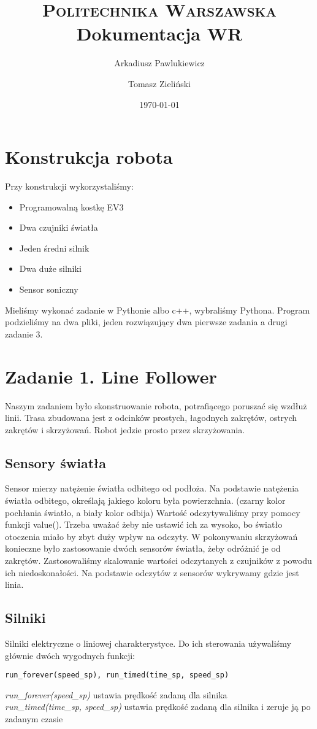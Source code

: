 \documentclass[paper=a4, fontsize=11pt]{scrartcl} %
\title{	
\normalfont \normalsize 
\textsc{Politechnika Warszawska} \\ [25pt] %
\huge Dokumentacja WR \\ %
}
\author{Arkadiusz Pawlukiewicz \and Tomasz Zieliński}
\date{\normalsize\today}
\numberwithin{equation}{section} %
\numberwithin{figure}{section} %
\numberwithin{table}{section} %
\begin{document}
\maketitle 

\section{Konstrukcja robota}
Przy konstrukcji wykorzystaliśmy:
\begin{itemize}  
\item Programowalną kostkę EV3 
\item Dwa czujniki światła  
\item Jeden średni silnik  
\item Dwa duże silniki  
\item Sensor soniczny 
\end{itemize}
Mieliśmy wykonać zadanie w Pythonie albo c++, wybraliśmy Pythona.  
Program podzieliśmy na dwa pliki, jeden rozwiązujący dwa pierwsze zadania a drugi zadanie 3. 
\section{Zadanie 1. Line Follower}
Naszym zadaniem było skonstruowanie robota, potrafiącego poruszać się wzdłuż linii. Trasa zbudowana jest z odcinków prostych, łagodnych zakrętów, ostrych zakrętów i skrzyżowań. Robot  jedzie prosto przez skrzyżowania. 
\subsection{Sensory światła }
Sensor mierzy natężenie światła odbitego od podłoża.  Na podstawie natężenia światła odbitego, określają jakiego koloru była powierzchnia. (czarny kolor pochłania światło, a biały kolor odbija) Wartość odczytywaliśmy przy pomocy funkcji value(). Trzeba uważać żeby nie ustawić ich za wysoko, bo światło otoczenia miało by zbyt duży wpływ na odczyty. W pokonywaniu  skrzyżowań konieczne było zastosowanie dwóch sensorów światła, żeby odróżnić je od zakrętów.  Zastosowaliśmy skalowanie wartości odczytanych z czujników z powodu ich  niedoskonałości.  Na podstawie odczytów z sensorów wykrywamy gdzie jest linia. 
\subsection{Silniki}
Silniki elektryczne o liniowej charakterystyce. Do ich sterowania używaliśmy głównie dwóch wygodnych funkcji:
\begin{lstlisting}
run_forever(speed_sp), run_timed(time_sp, speed_sp)
\end{lstlisting}
\textit{run\_forever(speed\_sp)} ustawia prędkość zadaną dla silnika \\
\textit{run\_timed(time\_sp, speed\_sp)}  ustawia prędkość zadaną dla silnika i zeruje ją po zadanym czasie
\end{document}
